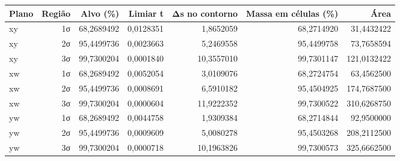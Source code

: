 \begin{tabular}{lrrrrrr}
\toprule
Plano & Região & Alvo (\%) & Limiar t & Δs no contorno & Massa em células (\%) & Área \\
\midrule
xy & 1σ & 68,2689492 & 0,0128351 & 1,8652059 & 68,2714920 & 31,4432422 \\
xy & 2σ & 95,4499736 & 0,0023663 & 5,2469558 & 95,4499758 & 73,7658594 \\
xy & 3σ & 99,7300204 & 0,0001840 & 10,3557010 & 99,7301147 & 121,0132422 \\
xw & 1σ & 68,2689492 & 0,0052054 & 3,0109076 & 68,2724754 & 63,4562500 \\
xw & 2σ & 95,4499736 & 0,0008691 & 6,5910182 & 95,4504925 & 174,7687500 \\
xw & 3σ & 99,7300204 & 0,0000604 & 11,9222352 & 99,7300522 & 310,6268750 \\
yw & 1σ & 68,2689492 & 0,0044758 & 1,9309384 & 68,2714844 & 92,9500000 \\
yw & 2σ & 95,4499736 & 0,0009609 & 5,0080278 & 95,4503268 & 208,2112500 \\
yw & 3σ & 99,7300204 & 0,0000718 & 10,1963826 & 99,7300573 & 325,6662500 \\
\bottomrule
\end{tabular}
